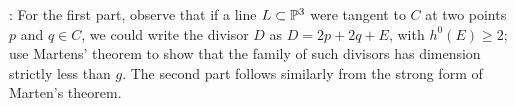 : For the first part, observe that if a line $L \subset \PP^3$ were tangent to $C$ at two points $p$ and $q \in C$, we could write the divisor $D$ as $D = 2p + 2q + E$, with $h^0(E) \geq 2$; use Martens' theorem to show that the family of such divisors has dimension strictly less than $g$. 
The second part follows similarly from the strong form of Marten's theorem.

%

